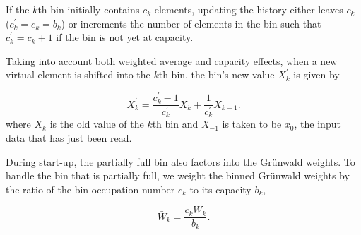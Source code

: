 If the $k$th bin initially contains $c_k$ elements,
updating the history either leaves $c_k$ ($c_k^\prime=c_k=b_k$) or
increments the number of elements in the bin such that $c_k^\prime =
c_k + 1$ if the bin is not yet at capacity. 

Taking into account both weighted average and capacity effects, when a new virtual element is shifted into the $k$th bin, the bin's new value $X_k^\prime$ is given by 

\begin{equation}
X_k^\prime = \frac{c_k^\prime-1}{c_k^\prime}X_k + \frac{1}{c_k^\prime}X_{k-1}.
\label{eqn:updating}
\end{equation}
where $X_k$ is the old value of the $k$th bin and $X_{-1}$ is taken to be $x_0$, the input data that has just been
read. 

During start-up, the partially full bin also factors into
the Gr{\"u}nwald weights. To handle the bin that is partially full, we
weight the binned Gr{\"u}nwald weights by the ratio of the bin occupation
number $c_k$ to its capacity $b_k$,

\begin{equation}
\bar{W}_k= \frac{c_k W_k}{b_k}.
\label{eqn:Wbar}
\end{equation} 







